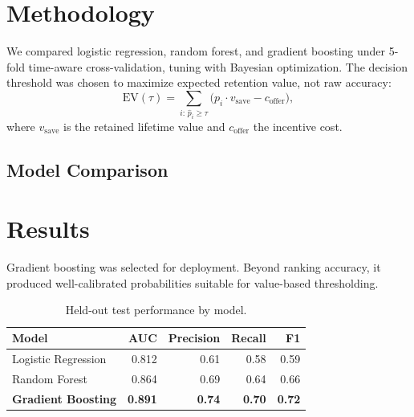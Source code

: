 \documentclass[11pt]{article}
\begin{document}
\section{Methodology}
We compared logistic regression, random forest, and gradient boosting under 5-fold
time-aware cross-validation, tuning with Bayesian optimization. The decision threshold was
chosen to maximize expected retention value, not raw accuracy:
\begin{equation}
\text{EV}(\tau)=\sum_{i:\,\hat p_i\ge\tau}\bigl(p_i\cdot v_{\text{save}}-c_{\text{offer}}\bigr),
\end{equation}
where $v_{\text{save}}$ is the retained lifetime value and $c_{\text{offer}}$ the incentive cost.

\subsection{Model Comparison}
\begin{center}
\end{center}

\section{Results}
Gradient boosting was selected for deployment. Beyond ranking accuracy, it produced
well-calibrated probabilities suitable for value-based thresholding.

\begin{table}[ht]\centering
\caption{Held-out test performance by model.}
\begin{tabularx}{\linewidth}{@{}X r r r r@{}}
\toprule
\textbf{Model} & \textbf{AUC} & \textbf{Precision} & \textbf{Recall} & \textbf{F1}\\
\midrule
Logistic Regression & 0.812 & 0.61 & 0.58 & 0.59\\
Random Forest       & 0.864 & 0.69 & 0.64 & 0.66\\
\textbf{Gradient Boosting} & \textbf{0.891} & \textbf{0.74} & \textbf{0.70} & \textbf{0.72}\\
\bottomrule
\end{tabularx}
\end{table}
\end{document}
